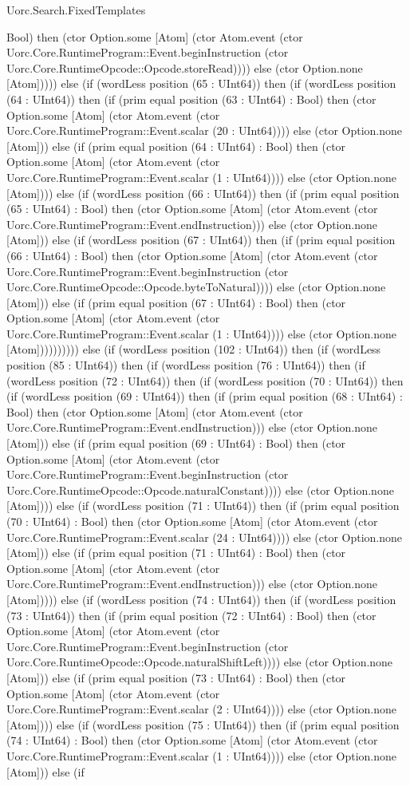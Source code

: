 \begin{lexlean}{Uorc.Search.FixedTemplates}
\begin{semanticmodule}
{Bool) then (ctor Option.some [Atom] (ctor Atom.event (ctor Uorc.Core.RuntimeProgram::Event.beginInstruction (ctor Uorc.Core.RuntimeOpcode::Opcode.storeRead)))) else (ctor Option.none [Atom])))) else (if (wordLess position (65 : UInt64)) then (if (wordLess position (64 : UInt64)) then (if (prim equal position (63 : UInt64) : Bool) then (ctor Option.some [Atom] (ctor Atom.event (ctor Uorc.Core.RuntimeProgram::Event.scalar (20 : UInt64)))) else (ctor Option.none [Atom])) else (if (prim equal position (64 : UInt64) : Bool) then (ctor Option.some [Atom] (ctor Atom.event (ctor Uorc.Core.RuntimeProgram::Event.scalar (1 : UInt64)))) else (ctor Option.none [Atom]))) else (if (wordLess position (66 : UInt64)) then (if (prim equal position (65 : UInt64) : Bool) then (ctor Option.some [Atom] (ctor Atom.event (ctor Uorc.Core.RuntimeProgram::Event.endInstruction))) else (ctor Option.none [Atom])) else (if (wordLess position (67 : UInt64)) then (if (prim equal position (66 : UInt64) : Bool) then (ctor Option.some [Atom] (ctor Atom.event (ctor Uorc.Core.RuntimeProgram::Event.beginInstruction (ctor Uorc.Core.RuntimeOpcode::Opcode.byteToNatural)))) else (ctor Option.none [Atom])) else (if (prim equal position (67 : UInt64) : Bool) then (ctor Option.some [Atom] (ctor Atom.event (ctor Uorc.Core.RuntimeProgram::Event.scalar (1 : UInt64)))) else (ctor Option.none [Atom]))))))))) else (if (wordLess position (102 : UInt64)) then (if (wordLess position (85 : UInt64)) then (if (wordLess position (76 : UInt64)) then (if (wordLess position (72 : UInt64)) then (if (wordLess position (70 : UInt64)) then (if (wordLess position (69 : UInt64)) then (if (prim equal position (68 : UInt64) : Bool) then (ctor Option.some [Atom] (ctor Atom.event (ctor Uorc.Core.RuntimeProgram::Event.endInstruction))) else (ctor Option.none [Atom])) else (if (prim equal position (69 : UInt64) : Bool) then (ctor Option.some [Atom] (ctor Atom.event (ctor Uorc.Core.RuntimeProgram::Event.beginInstruction (ctor Uorc.Core.RuntimeOpcode::Opcode.naturalConstant)))) else (ctor Option.none [Atom]))) else (if (wordLess position (71 : UInt64)) then (if (prim equal position (70 : UInt64) : Bool) then (ctor Option.some [Atom] (ctor Atom.event (ctor Uorc.Core.RuntimeProgram::Event.scalar (24 : UInt64)))) else (ctor Option.none [Atom])) else (if (prim equal position (71 : UInt64) : Bool) then (ctor Option.some [Atom] (ctor Atom.event (ctor Uorc.Core.RuntimeProgram::Event.endInstruction))) else (ctor Option.none [Atom])))) else (if (wordLess position (74 : UInt64)) then (if (wordLess position (73 : UInt64)) then (if (prim equal position (72 : UInt64) : Bool) then (ctor Option.some [Atom] (ctor Atom.event (ctor Uorc.Core.RuntimeProgram::Event.beginInstruction (ctor Uorc.Core.RuntimeOpcode::Opcode.naturalShiftLeft)))) else (ctor Option.none [Atom])) else (if (prim equal position (73 : UInt64) : Bool) then (ctor Option.some [Atom] (ctor Atom.event (ctor Uorc.Core.RuntimeProgram::Event.scalar (2 : UInt64)))) else (ctor Option.none [Atom]))) else (if (wordLess position (75 : UInt64)) then (if (prim equal position (74 : UInt64) : Bool) then (ctor Option.some [Atom] (ctor Atom.event (ctor Uorc.Core.RuntimeProgram::Event.scalar (1 : UInt64)))) else (ctor Option.none [Atom])) else (if }
\end{semanticmodule}
\end{lexlean}
